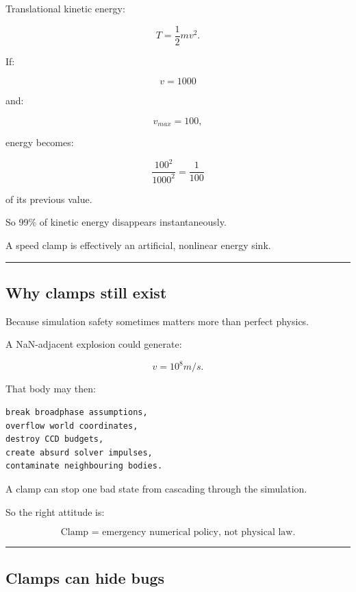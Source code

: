 \hypertarget{06-engine-ii-ch038-clamping-destroys-kinetic-energy-even-more-strongly}{}

Translational kinetic energy:

\[
T=
\frac12mv^2.
\]

If:

\[
v=1000
\]

and:

\[
v_{max}=100,
\]

energy becomes:

\[
\frac{100^2}{1000^2}
=
\frac1{100}
\]

of its previous value.

So 99\% of kinetic energy disappears instantaneously.

A speed clamp is effectively an artificial, nonlinear energy sink.

\begin{center}\rule{0.5\linewidth}{0.5pt}\end{center}

\subsection{Why clamps still exist}\label{06-engine-ii-ch038-why-clamps-still-exist}

\hypertarget{06-engine-ii-ch038-why-clamps-still-exist}{}

Because simulation safety sometimes matters more than perfect physics.

A NaN-adjacent explosion could generate:

\[
v=10^8m/s.
\]

That body may then:

\begin{verbatim}
break broadphase assumptions,
overflow world coordinates,
destroy CCD budgets,
create absurd solver impulses,
contaminate neighbouring bodies.
\end{verbatim}

A clamp can stop one bad state from cascading through the simulation.

So the right attitude is:

\[
\boxed{
\text{Clamp = emergency numerical policy, not physical law.}
}
\]

\begin{center}\rule{0.5\linewidth}{0.5pt}\end{center}

\subsection{Clamps can hide bugs}\label{06-engine-ii-ch038-clamps-can-hide-bugs}

